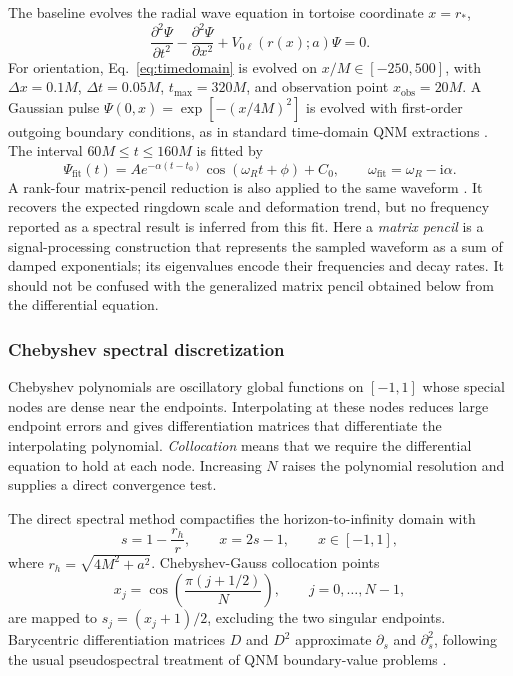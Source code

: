 \documentclass[12pt,a4paper]{article}
\newcommand{\ii}{\mathrm{i}}
\begin{document}
The baseline evolves the radial wave equation in tortoise coordinate \(x=r_*\),
\begin{equation}
\frac{\partial^2\Psi}{\partial t^2}
-
\frac{\partial^2\Psi}{\partial x^2}
+
V_{0\ell}(r(x);a)\Psi=0.
\label{eq:timedomain}
\end{equation}
\color{blue}
For orientation, Eq.~\eqref{eq:timedomain} is evolved on
\(x/M\in[-250,500]\), with \(\Delta x=0.1M\), \(\Delta t=0.05M\),
\(t_{\max}=320M\), and observation point \(x_{\mathrm{obs}}=20M\). A Gaussian
pulse \(\Psi(0,x)=\exp[-(x/4M)^2]\) is evolved with first-order outgoing
boundary conditions, as in standard time-domain QNM extractions
\cite{Gundlach1994,Konoplya2011,Konoplya2020}. The interval \(60M\leq t\leq160M\) is fitted by
\color{black}
\begin{equation*}
\Psi_{\mathrm{fit}}(t)=A e^{-\alpha(t-t_0)}
\cos(\omega_R t+\phi)+C_0,
\qquad
\omega_{\mathrm{fit}}=\omega_R-\ii\alpha.
\end{equation*}
\color{blue}
A rank-four matrix-pencil reduction is also applied to the same waveform
\cite{Hua1990}. It
recovers the expected ringdown scale and deformation trend, but no frequency
reported as a spectral result is inferred from this fit.
Here a \emph{matrix pencil} is a signal-processing construction that represents
the sampled waveform as a sum of damped exponentials; its eigenvalues encode
their frequencies and decay rates.  It should not be confused with the
generalized matrix pencil obtained below from the differential equation.
\color{black}

\subsubsection{Chebyshev spectral discretization}
\color{blue}

Chebyshev polynomials are oscillatory global functions on \([-1,1]\) whose
special nodes are dense near the endpoints.  Interpolating at these nodes
reduces large endpoint errors and gives differentiation matrices that
differentiate the interpolating polynomial.  \emph{Collocation} means that we
require the differential equation to hold at each node.  Increasing \(N\)
raises the polynomial resolution and supplies a direct convergence test.
\color{black}

The direct spectral method compactifies the horizon-to-infinity domain with
\begin{equation*}
s=1-\frac{r_h}{r},\qquad x=2s-1,\qquad x\in[-1,1],
\end{equation*}
where \(r_h=\sqrt{4M^2+a^2}\). Chebyshev-Gauss collocation points
\begin{equation*}
x_j=\cos\left(\frac{\pi(j+1/2)}{N}\right),\qquad j=0,\ldots,N-1,
\end{equation*}
\color{blue}
are mapped to \(s_j=(x_j+1)/2\), excluding the two singular endpoints.
Barycentric differentiation matrices \(D\) and \(D^2\) approximate
\(\partial_s\) and \(\partial_s^2\), following the usual pseudospectral
treatment of QNM boundary-value problems \cite{Jansen2017}.
\color{black}
\end{document}
